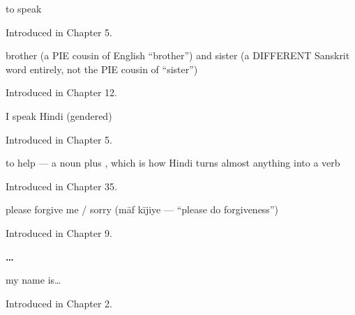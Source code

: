 \noindent\begin{minipage}[t]{\linewidth}
\raggedright
\textbf{}\par
\small to speak\par
\footnotesize Introduced in Chapter 5.
\end{minipage}\par\medskip

\noindent\begin{minipage}[t]{\linewidth}
\raggedright
\textbf{ }\par
\small brother (a PIE cousin of English \textquotedblleft{}brother\textquotedblright{}) and sister (a DIFFERENT Sanskrit word entirely, not the PIE cousin of \textquotedblleft{}sister\textquotedblright{})\par
\footnotesize Introduced in Chapter 12.
\end{minipage}\par\medskip

\noindent\begin{minipage}[t]{\linewidth}
\raggedright
\textbf{   }\par
\small I speak Hindi (gendered)\par
\footnotesize Introduced in Chapter 5.
\end{minipage}\par\medskip

\noindent\begin{minipage}[t]{\linewidth}
\raggedright
\textbf{ }\par
\small to help — a noun plus , which is how Hindi turns almost anything into a verb\par
\footnotesize Introduced in Chapter 35.
\end{minipage}\par\medskip

\noindent\begin{minipage}[t]{\linewidth}
\raggedright
\textbf{ }\par
\small please forgive me / sorry (māf kījiye — \textquotedblleft{}please do forgiveness\textquotedblright{})\par
\footnotesize Introduced in Chapter 9.
\end{minipage}\par\medskip

\noindent\begin{minipage}[t]{\linewidth}
\raggedright
\textbf{  … }\par
\small my name is…\par
\footnotesize Introduced in Chapter 2.
\end{minipage}\par\medskip

